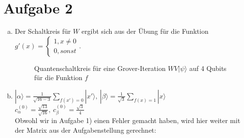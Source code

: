 \documentclass[a4paper]{scrartcl}
\begin{document}
\section*{Aufgabe 2}
\begin{enumerate}[a)]
\item
Der Schaltkreis für $W$ ergibt sich aus der Übung für die Funktion $g'(x) = \begin{cases} 1, x\neq 0\\ 0, sonst \end{cases}$.

\begin{figure}[htp] 
\caption{Quantenschaltkreis für eine Grover-Iteration $WV|\psi\rangle$ auf 4 Qubits für die Funktion $f$}
\end{figure}

\item $|\alpha\rangle = \frac{1}{\sqrt{16-3}} \sum_{f(x')=0} |x'\rangle,~ |\beta\rangle = \frac{1}{\sqrt{3}} \sum_{f(x)=1} |x\rangle$\\
$c_{\alpha}^{(0)} = \frac{\sqrt{13}}{\sqrt{16}},~ c_{\beta}^{(0)} = \frac{\sqrt{3}}{4}$\\

Obwohl wir in Aufgabe 1) einen Fehler gemacht haben, wird hier weiter mit der Matrix aus der Aufgabenstellung gerechnet:\\


\end{enumerate}
\end{document}
